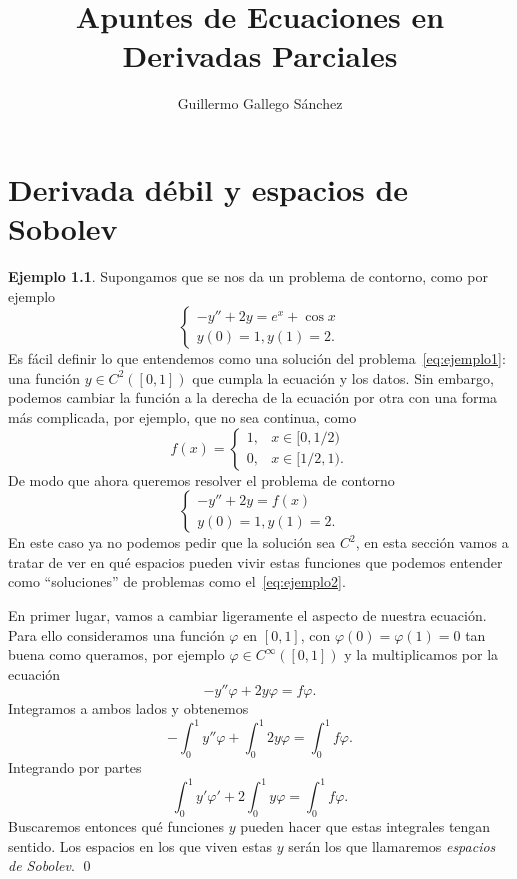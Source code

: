 \documentclass[12pt,a4paper]{book}
\title{Apuntes de Ecuaciones en Derivadas Parciales}
\author{Guillermo Gallego Sánchez}
\date{}
\theoremstyle{definition} \newtheorem{defn}[thm]{Definición}
\theoremstyle{definition} \newtheorem{ejemplo}[thm]{Ejemplo}
\theoremstyle{definition} \newtheorem{ejercicio}[thm]{Ejercicio}
\theoremstyle{remark} \newtheorem*{obs}{Observación}
\begin{document}
\maketitle
\tableofcontents
\chapter{Derivada débil y espacios de Sobolev}
\begin{ejemplo}\label{ejemplo1}
  Supongamos que se nos da un problema de contorno, como por ejemplo
  \begin{equation}
    \begin{cases}
      -y''+2y=e^x+\cos x \\
      y(0)=1, y(1)=2.
    \end{cases}
    \label{eq:ejemplo1}
  \end{equation}
  Es fácil definir lo que entendemos como una solución del problema~\eqref{eq:ejemplo1}: una función $y\in C^2([0,1])$ que cumpla la ecuación y los datos. Sin embargo, podemos cambiar la función a la derecha de la ecuación por otra con una forma más complicada, por ejemplo, que no sea continua, como
  \begin{equation*}
    f(x)=
    \begin{cases}
      1, & x \in [0,1/2) \\
      0, & x \in [1/2,1).
    \end{cases}
  \end{equation*}
  De modo que ahora queremos resolver el problema de contorno
  \begin{equation}
    \begin{cases}
      -y''+2y=f(x) \\
      y(0)=1, y(1)=2.
    \end{cases}
    \label{eq:ejemplo2}
  \end{equation}
  En este caso ya no podemos pedir que la solución sea $C^2$, en esta sección vamos a tratar de ver en qué espacios pueden vivir estas funciones que podemos entender como ``soluciones'' de problemas como el~\eqref{eq:ejemplo2}. 

  En primer lugar, vamos a cambiar ligeramente el aspecto de nuestra ecuación. Para ello consideramos una función $\varphi$ en $[0,1]$, con $\varphi(0)=\varphi(1)=0$ tan buena como queramos, por ejemplo $\varphi\in C^{\infty}([0,1])$ y la multiplicamos por la ecuación
  \begin{equation*}
    -y''\varphi + 2y \varphi = f \varphi.
  \end{equation*}
  Integramos a ambos lados y obtenemos
  \begin{equation*}
    -\int_0^1 y'' \varphi + \int_0^1 2y \varphi = \int_0^1 f \varphi.
  \end{equation*}
  Integrando por partes
  \begin{equation*}
    \int_0^1 y' \varphi' + 2 \int_0^1 y \varphi = \int_0^1 f \varphi.
  \end{equation*}
  Buscaremos entonces qué funciones $y$ pueden hacer que estas integrales tengan sentido. Los espacios en los que viven estas $y$ serán los que llamaremos \emph{espacios de Sobolev}. \qed
\end{ejemplo}
\end{document}
